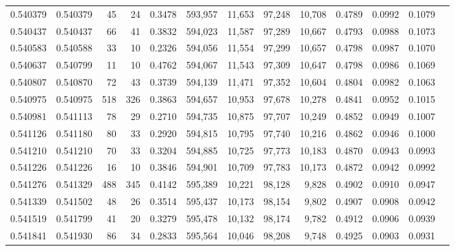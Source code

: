 \begin{tabular}{rrrrrrrrrrrrr}
0.540379 & 0.540379 &    45 &    24 &                                     0.3478 & 593,957 &  11,653 &  97,248 &  10,708 & 0.4789 & 0.0992 & 0.1079 \\
0.540437 & 0.540437 &    66 &    41 &                                     0.3832 & 594,023 &  11,587 &  97,289 &  10,667 & 0.4793 & 0.0988 & 0.1073 \\
0.540583 & 0.540588 &    33 &    10 &                                     0.2326 & 594,056 &  11,554 &  97,299 &  10,657 & 0.4798 & 0.0987 & 0.1070 \\
0.540637 & 0.540799 &    11 &    10 &                                     0.4762 & 594,067 &  11,543 &  97,309 &  10,647 & 0.4798 & 0.0986 & 0.1069 \\
0.540807 & 0.540870 &    72 &    43 &                                     0.3739 & 594,139 &  11,471 &  97,352 &  10,604 & 0.4804 & 0.0982 & 0.1063 \\
0.540975 & 0.540975 &   518 &   326 &                                     0.3863 & 594,657 &  10,953 &  97,678 &  10,278 & 0.4841 & 0.0952 & 0.1015 \\
0.540981 & 0.541113 &    78 &    29 &                                     0.2710 & 594,735 &  10,875 &  97,707 &  10,249 & 0.4852 & 0.0949 & 0.1007 \\
0.541126 & 0.541180 &    80 &    33 &                                     0.2920 & 594,815 &  10,795 &  97,740 &  10,216 & 0.4862 & 0.0946 & 0.1000 \\
0.541210 & 0.541210 &    70 &    33 &                                     0.3204 & 594,885 &  10,725 &  97,773 &  10,183 & 0.4870 & 0.0943 & 0.0993 \\
0.541226 & 0.541226 &    16 &    10 &                                     0.3846 & 594,901 &  10,709 &  97,783 &  10,173 & 0.4872 & 0.0942 & 0.0992 \\
0.541276 & 0.541329 &   488 &   345 &                                     0.4142 & 595,389 &  10,221 &  98,128 &   9,828 & 0.4902 & 0.0910 & 0.0947 \\
0.541339 & 0.541502 &    48 &    26 &                                     0.3514 & 595,437 &  10,173 &  98,154 &   9,802 & 0.4907 & 0.0908 & 0.0942 \\
0.541519 & 0.541799 &    41 &    20 &                                     0.3279 & 595,478 &  10,132 &  98,174 &   9,782 & 0.4912 & 0.0906 & 0.0939 \\
0.541841 & 0.541930 &    86 &    34 &                                     0.2833 & 595,564 &  10,046 &  98,208 &   9,748 & 0.4925 & 0.0903 & 0.0931 \\

\end{tabular}
